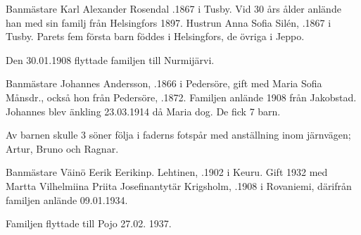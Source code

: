 Banmästare Karl Alexander Rosendal .1867 i Tusby. Vid 30 års ålder anlände han med sin familj från Helsingfors 1897. Hustrun Anna Sofia Silén, .1867 i Tusby. Parets fem första barn föddes i Helsingfors, de övriga i Jeppo.
\begin{jhchildren}
  \item {}
  \item {}
  \item {}
  \item {}
  \item {}
  \item {}
  \item {}
  \item {}
  \item {}
\end{jhchildren}
Den 30.01.1908 flyttade familjen till Nurmijärvi.

Banmästare Johannes Andersson, .1866 i Pedersöre, gift med Maria Sofia Månsdr., också hon från Pedersöre, .1872. Familjen anlände 1908 från Jakobstad. Johannes blev änkling 23.03.1914 då Maria dog. De fick 7 barn.
\begin{jhchildren}
  \item {}
  \item {}
  \item {}
  \item {}
  \item {}
  \item {}
  \item {}
\end{jhchildren}
Av barnen skulle 3 söner följa i faderns fotspår med anställning inom järnvägen; Artur, Bruno och Ragnar.


Banmästare Väinö Eerik Eerikinp. Lehtinen, .1902 i Keuru. Gift 1932 med Martta Vilhelmiina Priita Josefinantytär Krigsholm, .1908 i Rovaniemi, därifrån familjen anlände 09.01.1934.
\begin{jhchildren}
  \item {}
  \item {}
\end{jhchildren}
Familjen flyttade till Pojo 27.02. 1937.


